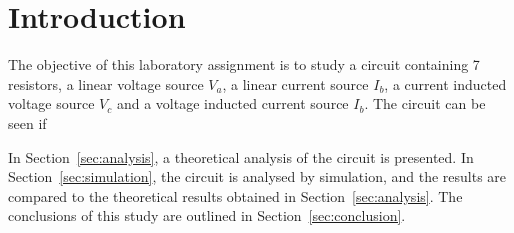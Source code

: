 \section{Introduction}
\label{sec:introduction}

The objective of this laboratory assignment is to study a circuit containing 7 resistors, a linear voltage source $V_a$, a linear current source $I_b$, a current inducted voltage source $V_c$ and a voltage inducted current source $I_b$. The circuit can be seen if %


In Section~\ref{sec:analysis}, a theoretical analysis of the circuit is
presented. In Section~\ref{sec:simulation}, the circuit is analysed by
simulation, and the results are compared to the theoretical results obtained in
Section~\ref{sec:analysis}. The conclusions of this study are outlined in
Section~\ref{sec:conclusion}.


